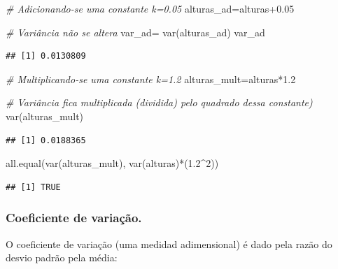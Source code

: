 \documentclass[
]{book}
\newenvironment{Shaded}{\begin{snugshade}}{\end{snugshade}}
\newcommand{\CommentTok}[1]{\textcolor[rgb]{0.56,0.35,0.01}{\textit{#1}}}
\newcommand{\DecValTok}[1]{\textcolor[rgb]{0.00,0.00,0.81}{#1}}
\newcommand{\FloatTok}[1]{\textcolor[rgb]{0.00,0.00,0.81}{#1}}
\newcommand{\FunctionTok}[1]{\textcolor[rgb]{0.00,0.00,0.00}{#1}}
\newcommand{\NormalTok}[1]{#1}
\newcommand{\OtherTok}[1]{\textcolor[rgb]{0.56,0.35,0.01}{#1}}
\newcommand{\SpecialCharTok}[1]{\textcolor[rgb]{0.00,0.00,0.00}{#1}}
\begin{document}
\begin{Shaded}
\begin{Highlighting}[]
\CommentTok{\# Adicionando{-}se uma constante k=0.05}
\NormalTok{alturas\_ad}\OtherTok{=}\NormalTok{alturas}\FloatTok{+0.05}

\CommentTok{\# Variância não se altera}
\NormalTok{var\_ad}\OtherTok{=} \FunctionTok{var}\NormalTok{(alturas\_ad)}
\NormalTok{var\_ad}
\end{Highlighting}
\end{Shaded}

\begin{verbatim}
## [1] 0.0130809
\end{verbatim}

\begin{Shaded}
\begin{Highlighting}[]
\CommentTok{\# Multiplicando{-}se uma constante k=1.2}
\NormalTok{alturas\_mult}\OtherTok{=}\NormalTok{alturas}\SpecialCharTok{*}\FloatTok{1.2}

\CommentTok{\# Variância fica multiplicada (dividida) pelo quadrado dessa constante)}
\FunctionTok{var}\NormalTok{(alturas\_mult)}
\end{Highlighting}
\end{Shaded}

\begin{verbatim}
## [1] 0.0188365
\end{verbatim}

\begin{Shaded}
\begin{Highlighting}[]
\FunctionTok{all.equal}\NormalTok{(}\FunctionTok{var}\NormalTok{(alturas\_mult), }\FunctionTok{var}\NormalTok{(alturas)}\SpecialCharTok{*}\NormalTok{(}\FloatTok{1.2}\SpecialCharTok{\^{}}\DecValTok{2}\NormalTok{)) }
\end{Highlighting}
\end{Shaded}

\begin{verbatim}
## [1] TRUE
\end{verbatim}

\hypertarget{coeficiente-de-variauxe7uxe3o.}{%
\subsubsection{Coeficiente de variação.}\label{coeficiente-de-variauxe7uxe3o.}}

O coeficiente de variação (uma medidad adimensional) é dado pela razão do desvio padrão pela média:
\end{document}
